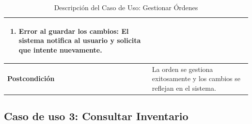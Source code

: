 \documentclass{article}
\begin{document}
\begin{table}[H]
\begin{tabular}{|l|p{12cm}|}
\begin{enumerate}
        \item \textbf{Error al guardar los cambios:} El sistema notifica al usuario y solicita que intente nuevamente.
    \end{enumerate} \\ \hline
    \textbf{Postcondición} & La orden se gestiona exitosamente y los cambios se reflejan en el sistema. \\ \hline
    \end{tabular}
    \caption{Descripción del Caso de Uso: Gestionar Órdenes}
    \label{tab:caso_uso_gestionar_ordenes}
\end{table}



\subsection{Caso de uso 3: Consultar Inventario}
\end{document}
